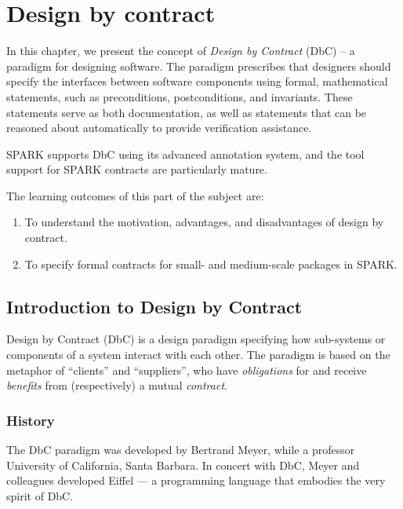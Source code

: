 \chapter{Design by contract}

In this chapter, we present the concept of \emph{Design by Contract} (DbC) -- a paradigm for designing software. The paradigm prescribes that designers should specify the interfaces between software components using formal, mathematical statements, such as preconditions, postconditions, and invariants. These statements serve as both documentation, as well as statements that can be reasoned about automatically to provide verification assistance.

SPARK supports DbC using its advanced annotation system, and the tool support for SPARK contracts are particularly mature.

The learning outcomes of this part of the subject are:

\begin{enumerate}

 \item To understand the motivation, advantages, and disadvantages of design by contract.

 \item To specify formal contracts for small- and medium-scale packages in SPARK.

\end{enumerate}

\section{Introduction to Design by Contract}

Design by Contract (DbC) \cite{meyer00} is a design paradigm specifying how sub-systems or components of a system interact with each other. The paradigm is based on the metaphor of ``clients'' and ``suppliers'', who have \emph{obligations} for and receive  \emph{benefits} from (respectively) a mutual \emph{contract}.

\subsection{History}

The DbC paradigm was developed by Bertrand Meyer, while a professor University of California, Santa Barbara. In concert with DbC, Meyer and colleagues developed Eiffel --- a programming language that embodies the very spirit of DbC.

